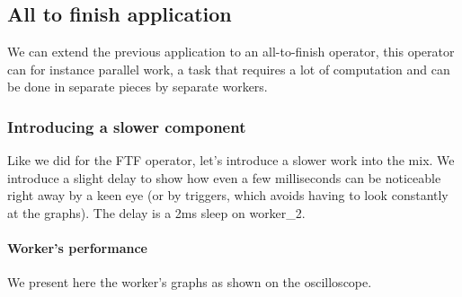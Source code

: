 \subsection{All to finish application}
    We can extend the previous application to an all-to-finish operator, this operator can for instance parallel work, a task that requires a lot of computation and can be done in separate pieces by separate workers. \cite{dq-tut}

        \subsubsection{Introducing a slower component}
            Like we did for the FTF operator, let's introduce a slower work into the mix. We introduce a slight delay to show how even a few milliseconds can be noticeable right away by a keen eye (or by triggers, which avoids having to look constantly at the graphs). The delay is a 2ms sleep on worker\_2.

        \paragraph{Worker's performance}
            We present here the worker's graphs as shown on the oscilloscope.

